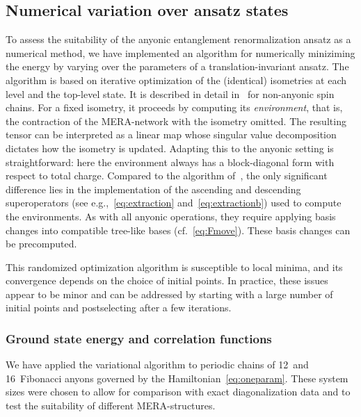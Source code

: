 \documentclass[floats,prb,twocolumn]{revtex4}
\begin{document}
\subsection{Numerical variation over ansatz states}
To assess the suitability of the anyonic entanglement renormalization ansatz as a numerical method, we have implemented an algorithm for numerically miniziming the energy by varying over the parameters of a translation-invariant ansatz.  The algorithm is based on iterative optimization of the (identical) isometries at each level and the top-level state. It is described in detail in~\cite{evenblyvidal09} for non-anyonic spin chains.  For a fixed isometry, it proceeds by computing its {\em environment}, that is, the contraction of the MERA-network with the isometry omitted. The resulting tensor can be interpreted as a linear map whose singular value decomposition dictates how the isometry is updated. Adapting this to the anyonic setting is straightforward: here the environment always has a block-diagonal form with respect to total charge. Compared to the algorithm of~\cite{evenblyvidal09}, the only significant difference lies in the implementation of the ascending and descending superoperators (see e.g.,~\eqref{eq:extraction} and~\eqref{eq:extractionb}) used to compute the environments.  As with all anyonic operations, they require  applying basis changes into compatible tree-like bases (cf.~\eqref{eq:Fmove}). These basis changes can be precomputed. 

This randomized optimization algorithm is susceptible to local minima, and its convergence depends on the choice of initial points. In practice, these issues appear to be minor and  can be addressed by starting with a large number of initial points and postselecting after a few iterations. 



\subsubsection*{Ground state energy and correlation functions}
We have applied the variational algorithm to periodic chains of 12~and 16~Fibonacci anyons governed by the Hamiltonian~\eqref{eq:oneparam}. These system sizes were chosen to allow for comparison with exact diagonalization data and to test the suitability of different MERA-structures. 
\end{document}
